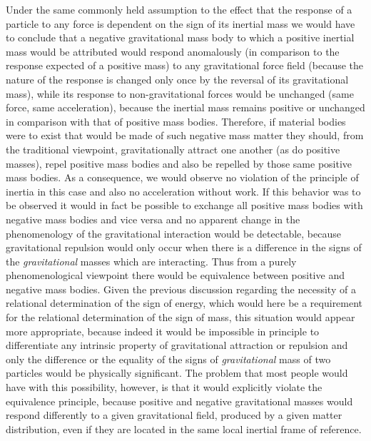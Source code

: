 \documentclass[notitlepage,12pt]{report}
\begin{document}
Under the same commonly held assumption to the effect that the response of a particle to any force is dependent on the sign of its inertial mass we would have to conclude that a negative gravitational mass body to which a positive inertial mass would be attributed would respond anomalously (in comparison to the response expected of a positive mass) to any gravitational force field (because the nature of the response is changed only once by the reversal of its gravitational mass), while its response to non-gravitational forces would be unchanged (same force, same acceleration), because the inertial mass remains positive or unchanged in comparison with that of positive mass bodies. Therefore, if material bodies were to exist that would be made of such negative mass matter they should, from the traditional viewpoint, gravitationally attract one another (as do positive masses), repel positive mass bodies and also be repelled by those same positive mass bodies. As a consequence, we would observe no violation of the principle of inertia in this case and also no acceleration without work. If this behavior was to be observed it would in fact be possible to exchange all positive mass bodies with negative mass bodies and vice versa and no apparent change in the phenomenology of the gravitational interaction would be detectable, because gravitational repulsion would only occur when there is a difference in the signs of the \textit{gravitational} masses which are interacting. Thus from a purely phenomenological viewpoint there would be equivalence between positive and negative mass bodies. Given the previous discussion regarding the necessity of a relational determination of the sign of energy, which would here be a requirement for the relational determination of the sign of mass, this situation would appear more appropriate, because indeed it would be impossible in principle to differentiate any intrinsic property of gravitational attraction or repulsion and only the difference or the equality of the signs of \textit{gravitational} mass of two particles would be physically significant. The problem that most people would have with this possibility, however, is that it would explicitly violate the equivalence principle, because positive and negative gravitational masses would respond differently to a given gravitational field, produced by a given matter distribution, even if they are located in the same local inertial frame of reference.
\end{document}
